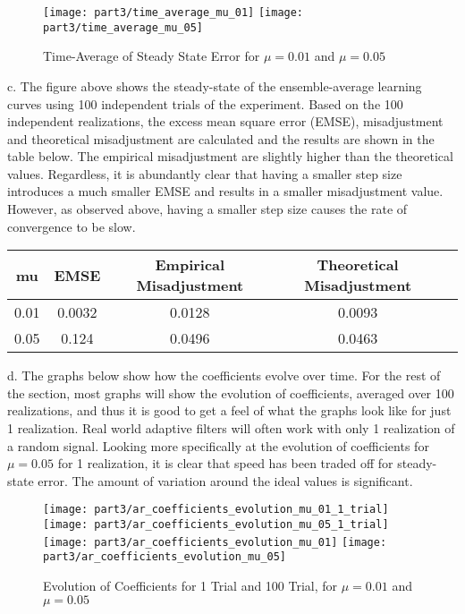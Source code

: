 \begin{figure}[H]
\centering{}
\texttt{[image: part3/time\_average\_mu\_01]}
\texttt{[image: part3/time\_average\_mu\_05]}
\caption{Time-Average of Steady State Error for $\mu=0.01$ and $\mu=0.05$}
\end{figure}

\noindent{}c. The figure above shows the steady-state of the ensemble-average learning curves using 100 independent trials of the experiment. Based on the 100 independent realizations, the excess mean square error (EMSE), misadjustment and theoretical misadjustment are calculated and the results are shown in the table below. The empirical misadjustment are slightly higher than the theoretical values. Regardless, it is abundantly clear that having a smaller step size introduces a much smaller EMSE and results in a smaller misadjustment value. However, as observed above, having a smaller step size causes the rate of convergence to be slow.  

\begin{table}[H]
\centering
\begin{tabular}{|c|c|c|c|c|}
\hline
mu   & EMSE   & Empirical Misadjustment 	& Theoretical Misadjustment		\\ \hline
0.01 & 0.0032 & 0.0128                 	& 0.0093                   		\\ \hline
0.05 & 0.124  & 0.0496                 	& 0.0463                  		\\ \hline
\end{tabular}
\end{table}

\noindent{}d. The graphs below show how the coefficients evolve over time. For the rest of the section, most graphs will show the evolution of coefficients, averaged over 100 realizations, and thus it is good to get a feel of what the graphs look like for just 1 realization. Real world adaptive filters will often work with only 1 realization of a random signal. Looking more specifically at the evolution of coefficients for $\mu=0.05$ for 1 realization, it is clear that speed has been traded off for steady-state error. The amount of variation around the ideal values is significant.

\begin{figure}[H]
\centering{}
\texttt{[image: part3/ar\_coefficients\_evolution\_mu\_01\_1\_trial]}
\texttt{[image: part3/ar\_coefficients\_evolution\_mu\_05\_1\_trial]} \\ 
\texttt{[image: part3/ar\_coefficients\_evolution\_mu\_01]}
\texttt{[image: part3/ar\_coefficients\_evolution\_mu\_05]}
\caption{Evolution of Coefficients for 1 Trial and 100 Trial, for $\mu=0.01$ and $\mu=0.05$}
\label{fig:steady_state_convergence}
\end{figure}

